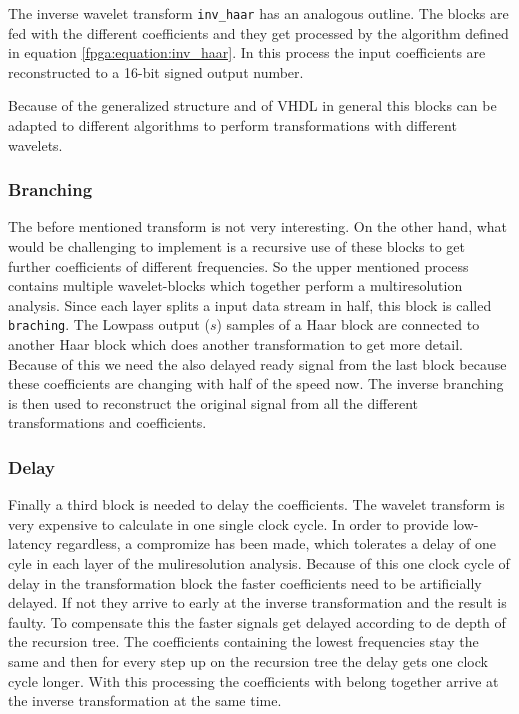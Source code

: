 \begin{refsection}
The inverse wavelet transform \texttt{inv\_haar} has an analogous outline.
The blocks are fed with the different coefficients and they get processed by the algorithm defined in equation \ref{fpga:equation:inv_haar}.
In this process the input coefficients are reconstructed to a 16-bit signed output number.%

Because of the generalized structure and of VHDL in general this blocks can be adapted to different algorithms to perform transformations with different wavelets.




\subsubsection{Branching}

The before mentioned transform is not very interesting. On the other hand, what would be challenging to implement is a recursive use of these blocks to get further coefficients of different frequencies.
So the upper mentioned process contains multiple wavelet-blocks which together perform a multiresolution analysis.
Since each layer splits a input data stream in half, this block is called \texttt{braching}.
The Lowpass output ($s$) samples of a Haar block are connected to another Haar block which does another transformation to get more detail. 
Because of this we need the also delayed ready signal from the last block because these coefficients are changing with half of the speed now. 
The inverse branching is then used to reconstruct the original signal from all the different transformations and coefficients.

\subsubsection{Delay}

Finally a third block is needed to delay the coefficients.
The wavelet transform is very expensive to calculate in one single clock cycle.
In order to provide low-latency regardless, a compromize has been made, which tolerates a delay of one cyle in each layer of the muliresolution analysis.
Because of this one clock cycle of delay in the transformation block the faster coefficients need to be artificially delayed.
If not they arrive to early at the inverse transformation and the result is faulty. To compensate this the   faster signals get delayed according to de depth of the recursion tree.
The coefficients containing the lowest frequencies stay the same and then for every step up on the recursion tree the delay gets one clock cycle longer.
With this processing the coefficients with belong together arrive at the inverse transformation at the same time.


\end{refsection}

